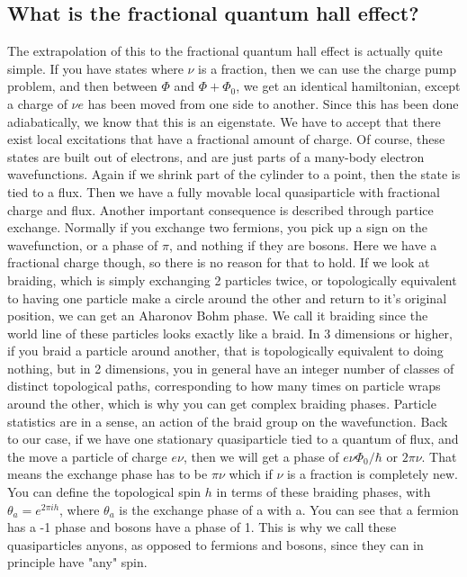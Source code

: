 \subsection{What is the fractional quantum hall effect?}

The extrapolation of this to the fractional quantum hall effect is actually quite simple. If you have states where $\nu$ is a fraction, then we can use the charge pump problem, and then between $\Phi$ and $\Phi + \Phi_0$, we get an identical hamiltonian, except a charge of $\nu e$ has been moved from one side to another. Since this has been done adiabatically, we know that this is an eigenstate. We have to accept that there exist local excitations that have a fractional amount of charge. Of course, these states are built out of electrons, and are just parts of a many-body electron wavefunctions. Again if we shrink part of the cylinder to a point, then the state is tied to a flux. Then we have a fully movable local quasiparticle with fractional charge and flux. Another important consequence is described through partice exchange. Normally if you exchange two fermions, you pick up a sign on the wavefunction, or a phase of $\pi$, and nothing if they are bosons. Here we have a fractional charge though, so there is no reason for that to hold. If we look at braiding, which is simply exchanging 2 particles twice, or topologically equivalent to having one particle make a circle around the other and return to it's original position, we can get an Aharonov Bohm phase. We call it braiding since the world line of these particles looks exactly like a braid. In 3 dimensions or higher, if you braid a particle around another, that is topologically equivalent to doing nothing, but in 2 dimensions, you in general have an integer number of classes of distinct topological paths, corresponding to how many times on particle wraps around the other, which is why you can get complex braiding phases. Particle statistics are in a sense, an action of the braid group on the wavefunction. Back to our case, if we have one stationary quasiparticle tied to a quantum of flux, and the move a particle of charge $e\nu$, then we will get a phase of $e\nu\Phi_0/\hbar$ or  $2\pi\nu$. That means the exchange phase has to be $\pi \nu$ which if $\nu$ is a fraction is completely new. You can define the topological spin $h$ in terms of these braiding phases, with $\theta_{a}=e^{2\pi i h}$, where $\theta_{a}$ is the exchange phase of a with a. You can see that a fermion has a -1 phase and bosons have a phase of 1. This is why we call these quasiparticles anyons, as opposed to fermions and bosons, since they can in principle have "any" spin. 

